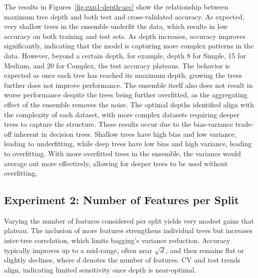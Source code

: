 \documentclass[conference]{IEEEtran}
\begin{document}
 The results in Figures~\ref{fig:exp1-depth-acc} show the relationship between maximum tree depth and both test and cross-validated accuracy. As expected, very shallow trees in the ensemble underfit the data, which results in low accuracy on both training and test sets. As depth increases, accuracy improves significantly, indicating that the model is capturing more complex patterns in the data. However, beyond a certain depth, for example,  depth 8 for Simple, 15 for Medium, and 20 for Complex, the test accuracy plateaus. The behavior is expected as once each tree has reached its maximum depth, growing the trees further does not improve performance. The ensemble itself also does not result in worse performance despite the trees being further overfitted, as the aggregating effect of the ensemble removes the noise. The optimal depths identified align with the complexity of each dataset, with more complex datasets requiring deeper trees to capture the structure. These results occur due to the bias-variance trade-off inherent in decision trees. Shallow trees have high bias and low variance, leading to underfitting, while deep trees have low bias and high variance, leading to overfitting. With more overfitted trees in the ensemble, the variance would average out more effectively, allowing for deeper trees to be used without overfitting.

\subsection{Experiment 2: Number of Features per Split}

Varying the number of features considered per split yields very modest gains that plateau. The inclusion of more features strengthens individual trees but increases inter-tree correlation, which limits bagging's variance reduction. Accuracy typically improves up to a mid-range, often near $\sqrt{d}$, and then remains flat or slightly declines, where $d$ denotes the number of features. CV and test trends align, indicating limited sensitivity once depth is near-optimal.
\end{document}
